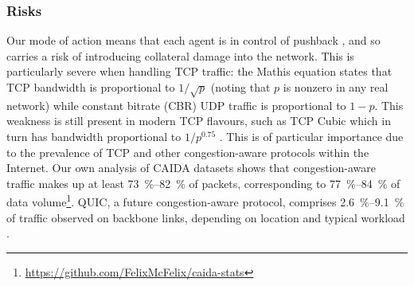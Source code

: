 \documentclass[10pt, times, comsoc]{IEEEtran}
\begin{document}
\subsubsection{Risks}
Our mode of action means that each agent is in control of pushback \cite{DBLP:journals/ccr/MahajanBFIPS02a}, and so carries a risk of introducing collateral damage into the network.
This is particularly severe when handling TCP traffic: the Mathis equation \cite{DBLP:journals/ccr/MathisSMO97} states that TCP bandwidth is proportional to $1/\sqrt{p}$ (noting that $p$ is nonzero in any real network) while constant bitrate (CBR) UDP traffic is proportional to $1 - p$.
This weakness is still present in modern TCP flavours, such as TCP Cubic which in turn has bandwidth proportional to $1/p^{0.75}$ \cite{rfc8312}.
This is of particular importance due to the prevalence of TCP and other congestion-aware protocols within the Internet.
Our own analysis of CAIDA datasets \cite{caida-2018-passive} shows that congestion-aware traffic makes up at least \SIrange{73}{82}{\percent} of packets, corresponding to \SIrange{77}{84}{\percent} of data volume\footnote{\url{https://github.com/FelixMcFelix/caida-stats}}.
QUIC, a future congestion-aware protocol, comprises \SIrange{2.6}{9.1}{\percent} of traffic observed on backbone links, depending on location and typical workload \cite{DBLP:conf/pam/RuthPDH18}.
\end{document}
